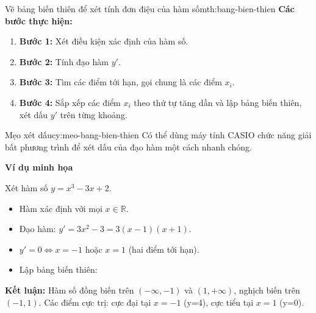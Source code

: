 \begin{lythuyetbox}{Vẽ bảng biến thiên để xét tính đơn điệu của hàm số}{mth:bang-bien-thien}
\textbf{Các bước thực hiện:}

\begin{enumerate}
    \item \textbf{Bước 1:} Xét điều kiện xác định của hàm số.
    \item \textbf{Bước 2:} Tính đạo hàm $y'$.
    \item \textbf{Bước 3:} Tìm các điểm tới hạn, gọi chung là các điểm $x_i$.
    \item \textbf{Bước 4:} Sắp xếp các điểm $x_i$ theo thứ tự tăng dần và lập bảng biến thiên, xét dấu $y'$ trên từng khoảng.
\end{enumerate}

\begin{chuy}{Mẹo xét dấu}{cy:meo-bang-bien-thien}
    Có thể dùng máy tính CASIO chức năng giải bất phương trình để xét dấu của đạo hàm một cách nhanh chóng.
\end{chuy}

\textbf{Ví dụ minh họa}

Xét hàm số $y = x^3 - 3x + 2$.

\begin{itemize}
    \item Hàm xác định với mọi $x \in \mathbb{R}$.
    \item Đạo hàm: $y' = 3x^2 - 3 = 3(x-1)(x+1)$.
    \item $y' = 0 \Leftrightarrow x = -1$ hoặc $x = 1$ (hai điểm tới hạn).
    \item Lập bảng biến thiên:
\end{itemize}

\begin{center}
\end{center}

\textbf{Kết luận:} Hàm số đồng biến trên $(-\infty, -1)$ và $(1, +\infty)$, nghịch biến trên $(-1, 1)$. Các điểm cực trị: cực đại tại $x = -1$ (y=4), cực tiểu tại $x = 1$ (y=0).

\end{lythuyetbox}
